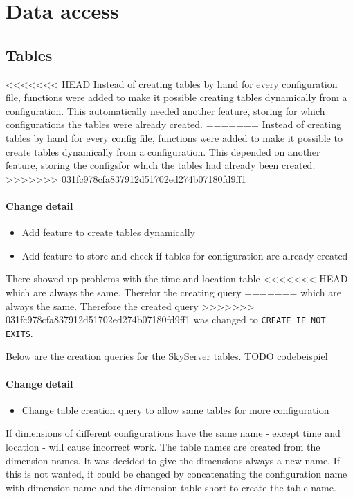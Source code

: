 \section{Data access}

\subsection{Tables}
<<<<<<< HEAD
Instead of creating tables by hand for every configuration file, functions
were added to make it possible creating tables dynamically from
a configuration. This automatically needed another feature,
storing for which configurations the tables were already created.
=======
Instead of creating tables by hand for every config file, functions
were added to make it possible to create tables dynamically from
a configuration. This depended on another feature,
storing the configsfor which the tables had already been created.
>>>>>>> 031fc978cfa837912d51702ed274b07180fd9ff1

\paragraph{Change detail}
\begin{itemize}
  \item Add feature to create tables dynamically
  \item Add feature to store and check if tables for configuration are already created
\end{itemize}

There showed up problems with the time and location table
<<<<<<< HEAD
which are always the same. Therefor the creating query
=======
which are always the same. Therefore the created query
>>>>>>> 031fc978cfa837912d51702ed274b07180fd9ff1
was changed to \texttt{CREATE IF NOT EXITS}.

Below are the creation queries for the SkyServer tables.
TODO codebeispiel

\paragraph{Change detail}
\begin{itemize}
  \item Change table creation query to allow same tables for more configuration
\end{itemize}

If dimensions of different configurations have the same name - except time and location -
will cause incorrect work. The table names are created from the dimension names.
It was decided to give the dimensions always a new name. If this is
not wanted, it could be changed by concatenating
the configuration name with dimension name and the dimension table short
to create the table name.

